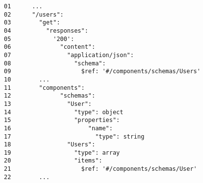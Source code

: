 \begin{figure}[!ht]
    \centering
        \begin{lstlisting}[style=htmlcssjs, label=lst:improving_scan_not_working_oas_example, caption=Snippet of an OpenAPI document in YAML defining a service that does not map to SCAN but should do. ,captionpos=b]
01      ...
02      "/users":
03        "get":
04          "responses":
05            '200':
06              "content":
07                "application/json":
08                  "schema":
09                    $ref: '#/components/schemas/Users'
10        ...            
11        "components":
12              "schemas":
13                "User":
14                  "type": object
15                  "properties":
16                      "name":
17                        "type": string
18                "Users":
19                  "type": array
20                  "items":
21                    $ref: '#/components/schemas/User'
22        ...
        \end{lstlisting}
\end{figure}